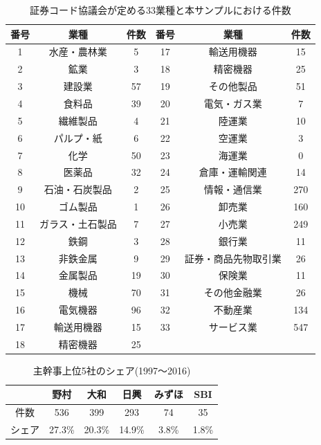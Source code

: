 \documentclass{jsarticle}
\begin{document}
\newpage
\begin{table}[!h]
\centering

  \caption{証券コード協議会が定める33業種と本サンプルにおける件数}
\begin{tabular}{|c|c|c||c|c|c|}

\hline
番号 & 業種 & 件数 & 番号 & 業種 & 件数 \\
\hline \hline
1 & 水産・農林業 & 5 & 17 & 輸送用機器 & 15 \\
2 & 鉱業 & 3 & 18 & 精密機器 & 25 \\
3 & 建設業 & 57 & 19 & その他製品 & 51 \\
4 & 食料品 & 39 & 20 & 電気・ガス業 & 7 \\
5 & 繊維製品 & 4 & 21 & 陸運業 & 10 \\
6 & パルプ・紙 & 6 & 22 & 空運業 & 3 \\
7 & 化学 & 50 & 23 & 海運業 & 0 \\
8 & 医薬品 & 32 & 24 & 倉庫・運輸関連 & 14 \\
9 & 石油・石炭製品 & 2 & 25 & 情報・通信業 & 270 \\
10 & ゴム製品 & 1 & 26 & 卸売業 & 160 \\
11 & ガラス・土石製品 & 7 & 27 & 小売業 & 249 \\
12 & 鉄鋼 & 3 & 28 & 銀行業 & 11 \\
13 & 非鉄金属 & 9 & 29 & 証券・商品先物取引業  & 26 \\
14 & 金属製品 & 19 & 30 & 保険業 & 11 \\
15 & 機械 & 70 & 31 & その他金融業 & 26 \\
16 & 電気機器 & 96 & 32 & 不動産業 & 134 \\
17 & 輸送用機器 & 15 & 33 & サービス業 & 547 \\
18 & 精密機器 & 25 &  &  &  \\

\hline
	\end{tabular}
		\label{industry}
\end{table}

\begin{table}[h]
  \begin{center}
  \caption{主幹事上位5社のシェア(1997〜2016)}
\begin{tabular*}{120mm}{@{\extracolsep{\fill}}c|ccccc}

\hline
\ &  野村 &  大和 & 日興 & みずほ & SBI \\
\hline \hline
件数  &   536 & 399 & 293 & 74 & 35 \\
シェア & 27.3\% & 20.3\% & 14.9\% & 3.8\% & 1.8\% \\
\hline
	\end{tabular*}
	\label{lead} 
  \end{center}
\end{table}
\end{document}
